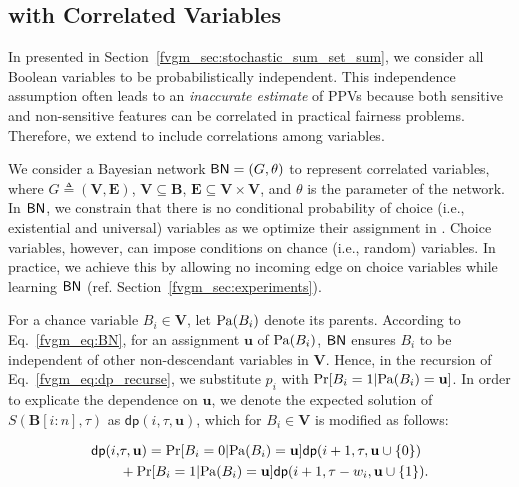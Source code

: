 	
\subsection{{\stochastic} with Correlated Variables} 
\label{fvgm_sec:dp_with_BN}
In {\stochastic} presented in Section~\ref{fvgm_sec:stochastic_sum_set_sum}, we consider all  Boolean variables to be probabilistically independent. This independence assumption often leads to an \textit{inaccurate estimate} of PPVs because both sensitive and non-sensitive features can be correlated in practical fairness problems. Therefore, we extend {\stochastic} to include correlations among variables.

We consider a Bayesian network $ \mathsf{BN} = (G, \theta) $ to represent correlated variables, where $ G \triangleq (\mathbf{V}, \mathbf{E}) $, $ \mathbf{V} \subseteq \mathbf{B} $, $ \mathbf{E} \subseteq \mathbf{V} \times \mathbf{V}  $, and $ \theta $ is the parameter of the network.  In  $ \mathsf{BN} $, we constrain that there is no conditional probability of choice (i.e., existential and universal) variables as we optimize their assignment in {\stochastic}. Choice variables, however, can impose conditions on chance (i.e., random) variables. In practice, we achieve this by allowing no incoming edge on choice variables while learning $ \mathsf{BN} $ (ref. Section~\ref{fvgm_sec:experiments}).
   	
   	

For a chance variable $ B_i \in \mathbf{V} $, let $ \mathrm{Pa}(B_i) $ denote its parents. According to Eq.~\eqref{fvgm_eq:BN},  for an assignment $ \mathbf{u} $ of $ \mathrm{Pa}(B_i) $, $ \mathsf{BN} $ ensures $ B_i $ to be independent of other non-descendant variables in $ \mathbf{V} $. Hence, in the recursion of Eq.~\eqref{fvgm_eq:dp_recurse}, we substitute  $ p_i $  with  $ \Pr[B_i = 1| \mathrm{Pa}(B_i) = \mathbf{u}] $. In order to explicate the dependence on $ \mathbf{u} $, we denote the expected solution of $ S(\mathbf{B}[i:n], \tau) $ as 
$ \mathsf{dp}(i, \tau, \mathbf{u}) $, which for $ B_i \in \mathbf{V} $ is modified as follows:

\begin{align*}
	\mathsf{dp}(i,  &\tau, \mathbf{u}) = \Pr[B_i = 0| \mathrm{Pa}(B_i) = \mathbf{u}] \mathsf{dp}(i+1, \tau, \mathbf{u} \cup \{0\})  \\
	& + \Pr[B_i = 1| \mathrm{Pa}(B_i) = \mathbf{u}]  \mathsf{dp}(i+1, \tau-w_i, \mathbf{u} \cup \{1\}).
\end{align*}

